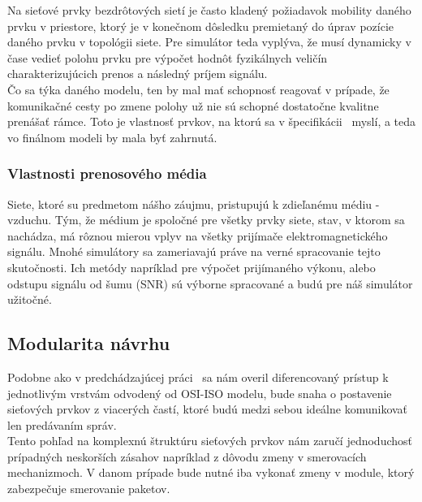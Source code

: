 \indent\indent Na sieťové prvky bezdrôtových sietí je často kladený požiadavok mobility daného prvku v priestore, ktorý je v konečnom dôsledku premietaný do úprav pozície daného prvku v topológii siete. Pre simulátor teda vyplýva, že musí dynamicky v čase vedieť polohu prvku pre výpočet hodnôt fyzikálnych veličín charakterizujúcich prenos a následný príjem signálu.\\
\indent Čo sa týka daného modelu, ten by mal mať schopnosť reagovať v prípade, že komunikačné cesty po zmene polohy už nie sú schopné dostatočne kvalitne prenášať rámce. Toto je vlastnosť prvkov, na ktorú sa v špecifikácii~\cite{ieee06} myslí, a teda vo finálnom modeli by mala byť zahrnutá.

\subsubsection{Vlastnosti prenosového média}

\indent\indent Siete, ktoré su predmetom nášho záujmu, pristupujú k zdieľanému médiu - vzduchu. Tým, že médium je spoločné pre všetky prvky siete, stav, v ktorom sa nachádza, má rôznou mierou vplyv na všetky prijímače elektromagnetického signálu. Mnohé simulátory sa zameriavajú práve na verné spracovanie tejto skutočnosti. Ich metódy napríklad pre výpočet prijímaného výkonu, alebo odstupu signálu od šumu (SNR) sú výborne spracované a budú pre náš simulátor užitočné.

\subsection{Modularita návrhu}

\indent\indent Podobne ako v predchádzajúcej práci~\cite{halas03} sa nám overil diferencovaný prístup k jednotlivým vrstvám  odvodený od OSI-ISO modelu, bude snaha o postavenie sieťových prvkov z viacerých častí, ktoré budú medzi sebou ideálne komunikovať len predávaním správ.\\
\indent Tento pohľad na komplexnú štruktúru sieťových prvkov nám zaručí jednoduchosť prípadných neskorších zásahov napríklad z dôvodu zmeny v smerovacích mechanizmoch. V danom prípade bude nutné iba vykonať zmeny v module, ktorý zabezpečuje smerovanie paketov.
